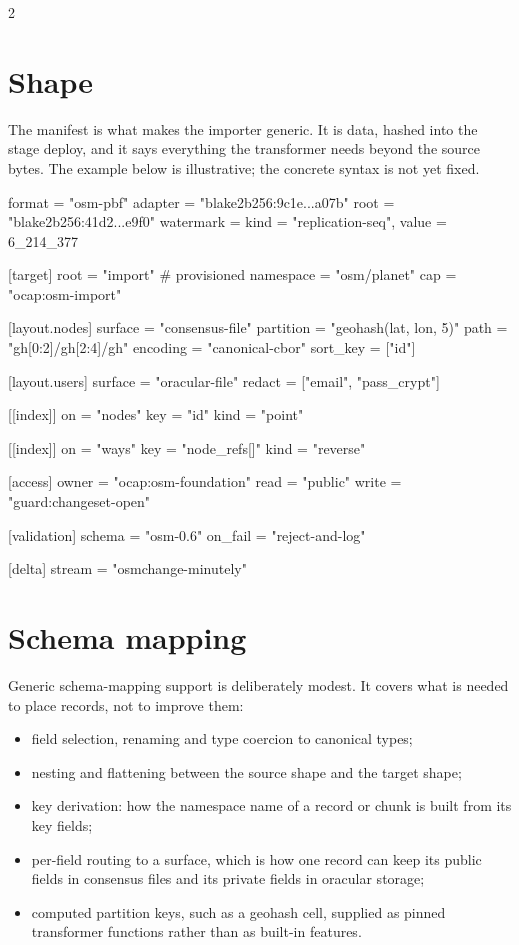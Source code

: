 \documentclass[10pt]{article}
\begin{document}
\begin{multicols}{2}

\section{Shape}\label{sec:manifest}

The manifest is what makes the importer generic. It is data, hashed into the
stage deploy, and it says everything the transformer needs beyond the source
bytes. The example below is illustrative; the concrete syntax is not yet fixed.

\begin{manifest}
[source]
format    = "osm-pbf"
adapter   = "blake2b256:9c1e...a07b"
root      = "blake2b256:41d2...e9f0"
watermark = { kind = "replication-seq",
              value = 6_214_377 }

[target]
root      = "import"        # provisioned
namespace = "osm/planet"
cap       = "ocap:osm-import"

[layout.nodes]
surface   = "consensus-file"
partition = "geohash(lat, lon, 5)"
path      = "{gh[0:2]}/{gh[2:4]}/{gh}"
encoding  = "canonical-cbor"
sort_key  = ["id"]

[layout.users]
surface   = "oracular-file"
redact    = ["email", "pass_crypt"]

[[index]]
on   = "nodes"
key  = "id"
kind = "point"

[[index]]
on   = "ways"
key  = "node_refs[]"
kind = "reverse"

[access]
owner = "ocap:osm-foundation"
read  = "public"
write = "guard:changeset-open"

[validation]
schema  = "osm-0.6"
on_fail = "reject-and-log"

[delta]
stream = "osmchange-minutely"
\end{manifest}

\section{Schema mapping}

Generic schema-mapping support is deliberately modest. It covers what is needed
to place records, not to improve them:

\begin{itemize}
\item field selection, renaming and type coercion to canonical types;
\item nesting and flattening between the source shape and the target shape;
\item key derivation: how the namespace name of a record or chunk is built from
  its key fields;
\item per-field routing to a surface, which is how one record can keep its public
  fields in consensus files and its private fields in oracular storage;
\item computed partition keys, such as a geohash cell, supplied as pinned
  transformer functions rather than as built-in features.
\end{itemize}


\end{multicols}
\end{document}
